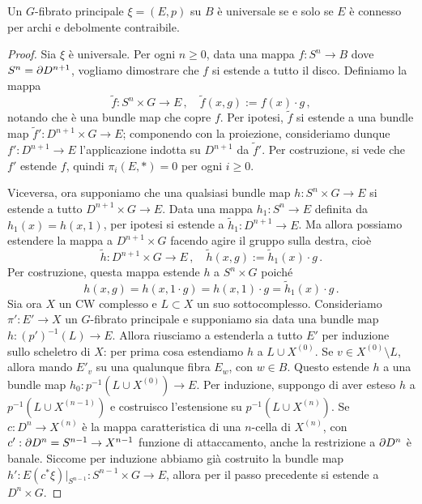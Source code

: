 \begin{thm}
	Un $G$-fibrato principale $\xi = (E,p)$ su $B$ è universale
	se e solo se $E$ è connesso per archi e debolmente contraibile.
	\begin{proof}
		Sia $\xi$ è universale. Per ogni $n \ge 0$,
		data una mappa $f:S^{n} \to B$ dove $S^{n}=\partial D^{n+1}$,
		vogliamo dimostrare che $f$ si estende a tutto il disco.
		Definiamo la mappa
		\begin{equation*}
			\widetilde{f} : S^{n} \times G \longrightarrow E\,,
			\quad \widetilde{f}(x,g) := f(x) \cdot g\,,
		\end{equation*}
		notando che è una bundle map che copre $f$.
		Per ipotesi, $\widetilde{f}$ si estende a una bundle map 
		$\widetilde{f}':D^{n+1} \times G \to E$; componendo con la proiezione,
		consideriamo dunque $f':D^{n+1} \to E$ l'applicazione indotta su $D^{n+1}$
		da $\widetilde{f}'$. Per costruzione, si vede che $f'$ estende $f$,
		quindi $\pi_{i}(E,\ast) = 0$ per ogni $i \ge 0$.
		
		Viceversa, ora supponiamo che una qualsiasi bundle map
		$h:S^{n} \times G \to E$ si estende a tutto $D^{n+1} \times G \to E$.
		Data una mappa $h_{1}:S^{n} \to E$ definita da $h_{1}(x) = h(x,1)$,
		per ipotesi si estende a $\widetilde{h}_{1}:D^{n+1} \to E$.
		Ma allora possiamo estendere la mappa a $D^{n+1} \times G$
		facendo agire il gruppo sulla destra, cioè
		\begin{equation*}
			\widetilde{h} : D^{n+1} \times G \longrightarrow E\,,
			\quad \widetilde{h}(x,g) := \widetilde{h}_{1}(x) \cdot g\,.
		\end{equation*}
		Per costruzione, questa mappa estende $h$ a $S^{n} \times G$ poiché
		\begin{equation*}
			h(x,g) = h(x,1 \cdot g) = h(x,1) \cdot g = \widetilde{h}_{1}(x) \cdot g\,.
		\end{equation*}
		Sia ora $X$ un CW complesso e $L \subset X$ un suo sottocomplesso.
		Consideriamo $\pi':E' \to X$ un $G$-fibrato principale e
		supponiamo sia data una bundle map $h:(p')^{-1}(L) \to E$.
		Allora riusciamo a estenderla a tutto $E'$ per induzione sullo scheletro di $X$:
		per prima cosa estendiamo $h$ a $L \cup X^{(0)}$. Se $v \in X^{(0)} \setminus L$,
		allora mando $E'_{v}$ su una qualunque fibra $E_{w}$, con $w \in B$.
		Questo estende $h$ a una bundle map $h_{0}:p^{-1}(L \cup X^{(0)}) \to E$.
		Per induzione, suppongo di aver esteso $h$ a $p^{-1}(L \cup X^{(n-1)})$
		e costruisco l'estensione su $p^{-1}(L \cup X^{(n)})$.
		Se $c:D^{n} \to X^{(n)}$ è la mappa caratteristica di una $n$-cella di $X^{(n)}$,
		con $c':\partial D^{n} = S^{n-1} \to X^{n-1}$ funzione di attaccamento,
		anche la restrizione a $\partial D^{n}$ è banale.
		Siccome per induzione abbiamo già costruito la bundle map
		$h': E(c^{*}\xi)\vert_{S^{n-1}} : S^{n-1} \times G \to E$,
		allora per il passo precedente si estende a $D^{n} \times G$.
	\end{proof}
\end{thm} 



